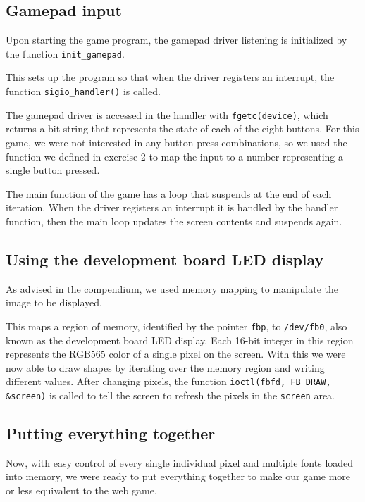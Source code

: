 \newpage
\subsection{Gamepad input}
\label{gamepad-input}
Upon starting the game program, the gamepad driver listening is initialized by the function \texttt{init\_gamepad}.



This sets up the program so that when the driver registers an interrupt, the function \texttt{sigio\_handler()} is called.


The gamepad driver is accessed in the handler with \texttt{fgetc(device)}, which returns a bit string that represents the state of each of the eight buttons.
For this game, we were not interested in any button press combinations, so we used the function we defined in exercise 2 to map the input to a number representing a single button pressed.



The main function of the game has a loop that suspends at the end of each iteration.
When the driver registers an interrupt it is handled by the handler function, then the main loop updates the screen contents and suspends again.

\newpage


\newpage


\newpage
\subsection{Using the development board LED display}
As advised in the compendium, we used memory mapping to manipulate the image to be displayed.



This maps a region of memory, identified by the pointer \texttt{fbp}, to \texttt{/dev/fb0}, also known as the development board LED display.
Each 16-bit integer in this region represents the RGB565 color of a single pixel on the screen.
With this we were now able to draw shapes by iterating over the memory region and writing different values.
After changing pixels, the function \texttt{ioctl(fbfd, FB\_DRAW, \&screen)} is called to tell the screen to refresh the pixels in the \texttt{screen} area.

\subsection{Putting everything together}
Now, with easy control of every single individual pixel and multiple fonts loaded into memory, we were ready to put everything together to make our game more or less equivalent to the web game.

